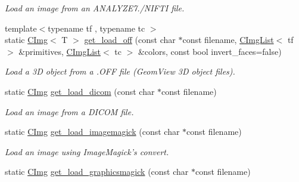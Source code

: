 \begin{DoxyCompactItemize}
\begin{DoxyCompactList}\small\item\em Load an image from an A\-N\-A\-L\-Y\-Z\-E7./\-N\-I\-F\-T\-I file. \end{DoxyCompactList}\item 
\hypertarget{structcimg__library_1_1_c_img_a30ad74cc7e26fdfdea57ed0aeb60a58d}{{\footnotesize template$<$typename tf , typename tc $>$ }\\static \hyperlink{structcimg__library_1_1_c_img}{C\-Img}$<$ T $>$ \hyperlink{structcimg__library_1_1_c_img_a30ad74cc7e26fdfdea57ed0aeb60a58d}{get\-\_\-load\-\_\-off} (const char $\ast$const filename, \hyperlink{structcimg__library_1_1_c_img_list}{C\-Img\-List}$<$ tf $>$ \&primitives, \hyperlink{structcimg__library_1_1_c_img_list}{C\-Img\-List}$<$ tc $>$ \&colors, const bool invert\-\_\-faces=false)}\label{structcimg__library_1_1_c_img_a30ad74cc7e26fdfdea57ed0aeb60a58d}

\begin{DoxyCompactList}\small\item\em Load a 3\-D object from a .O\-F\-F file (Geom\-View 3\-D object files). \end{DoxyCompactList}\item 
\hypertarget{structcimg__library_1_1_c_img_a9a48fd037190ca8426c1078f4c18cedb}{static \hyperlink{structcimg__library_1_1_c_img}{C\-Img} \hyperlink{structcimg__library_1_1_c_img_a9a48fd037190ca8426c1078f4c18cedb}{get\-\_\-load\-\_\-dicom} (const char $\ast$const filename)}\label{structcimg__library_1_1_c_img_a9a48fd037190ca8426c1078f4c18cedb}

\begin{DoxyCompactList}\small\item\em Load an image from a D\-I\-C\-O\-M file. \end{DoxyCompactList}\item 
\hypertarget{structcimg__library_1_1_c_img_ad982fff24870aac6b8c55a5564969b5d}{static \hyperlink{structcimg__library_1_1_c_img}{C\-Img} \hyperlink{structcimg__library_1_1_c_img_ad982fff24870aac6b8c55a5564969b5d}{get\-\_\-load\-\_\-imagemagick} (const char $\ast$const filename)}\label{structcimg__library_1_1_c_img_ad982fff24870aac6b8c55a5564969b5d}

\begin{DoxyCompactList}\small\item\em Load an image using Image\-Magick's convert. \end{DoxyCompactList}\item 
\hypertarget{structcimg__library_1_1_c_img_a494cfc018d563a30fd1ea69097ed0c19}{static \hyperlink{structcimg__library_1_1_c_img}{C\-Img} \hyperlink{structcimg__library_1_1_c_img_a494cfc018d563a30fd1ea69097ed0c19}{get\-\_\-load\-\_\-graphicsmagick} (const char $\ast$const filename)}\label{structcimg__library_1_1_c_img_a494cfc018d563a30fd1ea69097ed0c19}


\end{DoxyCompactItemize}
